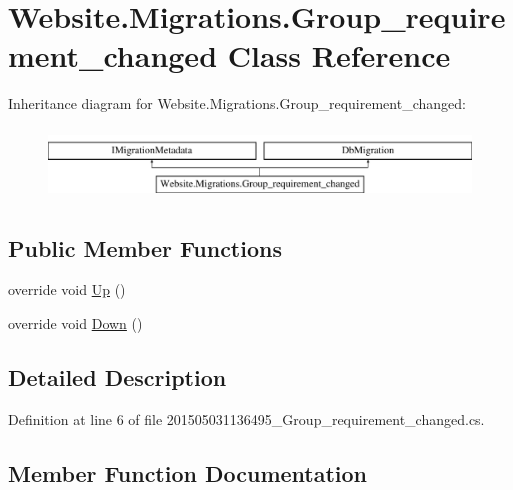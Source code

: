 \hypertarget{class_website_1_1_migrations_1_1_group__requirement__changed}{}\section{Website.\+Migrations.\+Group\+\_\+requirement\+\_\+changed Class Reference}
\label{class_website_1_1_migrations_1_1_group__requirement__changed}
Inheritance diagram for Website.\+Migrations.\+Group\+\_\+requirement\+\_\+changed\+:\begin{figure}[H]
\begin{center}
\leavevmode
\includegraphics[height=1.898305cm]{class_website_1_1_migrations_1_1_group__requirement__changed}
\end{center}
\end{figure}
\subsection*{Public Member Functions}
\begin{DoxyCompactItemize}
\item 
override void \hyperlink{class_website_1_1_migrations_1_1_group__requirement__changed_a644190a04106596d946dbc63b276102d}{Up} ()
\item 
override void \hyperlink{class_website_1_1_migrations_1_1_group__requirement__changed_aa24427485a8489d930bdb43ee3f5281c}{Down} ()
\end{DoxyCompactItemize}


\subsection{Detailed Description}


Definition at line 6 of file 201505031136495\+\_\+\+Group\+\_\+requirement\+\_\+changed.\+cs.



\subsection{Member Function Documentation}
\hypertarget{class_website_1_1_migrations_1_1_group__requirement__changed_aa24427485a8489d930bdb43ee3f5281c}{}
